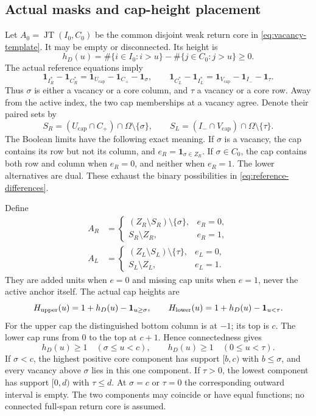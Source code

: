 \documentclass[11pt,a4paper]{amsart}
\numberwithin{equation}{section}
\theoremstyle{plain}
\theoremstyle{definition}
\newcommand{\one}{\mathbf1}
\newcommand{\JT}{\operatorname{JT}}
\begin{document}
\subsection{Actual masks and cap-height placement}
Let \(A_0=\JT(I_0,C_0)\) be the common disjoint weak return core in \eqref{eq:vacancy-template}.  It may be empty or disconnected.  Its height is
\[
 h_D(u)=\#\{i\in I_0:i>u\}-\#\{j\in C_0:j>u\}\ge0.
\]
The actual reference equations imply
\begin{equation}\label{eq:reference-differences}
 \one_{I_R^*}-\one_{C_R^*}=\one_{U_{\mathrm{cap}}}-\one_{C_+}-\one_\sigma,
 \qquad
 \one_{C_L^*}-\one_{I_L^*}=\one_{V_{\mathrm{cap}}}-\one_{I_-}-\one_\tau.
\end{equation}
Thus \(\sigma\) is either a vacancy or a core column, and \(\tau\) a vacancy or a core row.  Away from the active index, the two cap memberships at a vacancy agree.  Denote their paired sets by
\[
 S_R=(U_{\mathrm{cap}}\cap C_+)\cap\Omega\setminus\{\sigma\},\qquad
 S_L=(I_-\cap V_{\mathrm{cap}})\cap\Omega\setminus\{\tau\}.
\]
The Boolean limits have the following exact meaning.  If \(\sigma\) is a vacancy, the cap contains its row but not its column, and \(e_R=\one_{\sigma\in Z_R}\).  If \(\sigma\in C_0\), the cap contains both row and column when \(e_R=0\), and neither when \(e_R=1\).  The lower alternatives are dual.  These exhaust the binary possibilities in \eqref{eq:reference-differences}.

Define
\[
\begin{split}
 A_R&=
 \begin{cases}(Z_R\setminus S_R)\setminus\{\sigma\},&e_R=0,\\
 S_R\setminus Z_R,&e_R=1,
 \end{cases}\\
 A_L&=
 \begin{cases}(Z_L\setminus S_L)\setminus\{\tau\},&e_L=0,\\
 S_L\setminus Z_L,&e_L=1.
 \end{cases}
\end{split}
\]
They are added units when \(e=0\) and missing cap units when \(e=1\), never the active anchor itself.  The actual cap heights are
\begin{equation}\label{eq:cap-height-pole}
 H_{\rm upper}(u)=1+h_D(u)-\one_{u\ge\sigma},\qquad
 H_{\rm lower}(u)=1+h_D(u)-\one_{u<\tau}.
\end{equation}
For the upper cap the distinguished bottom column is at \(-1\); its top is \(c\).  The lower cap runs from \(0\) to the top at \(c+1\).  Hence connectedness gives
\begin{equation}\label{eq:cap-height-positive}
 h_D(u)\ge1\quad(\sigma\le u<c),\qquad
 h_D(u)\ge1\quad(0\le u<\tau).
\end{equation}
If \(\sigma<c\), the highest positive core component has support \([b,c)\) with \(b\le\sigma\), and every vacancy above \(\sigma\) lies in this one component.  If \(\tau>0\), the lowest component has support \([0,d)\) with \(\tau\le d\).  At \(\sigma=c\) or \(\tau=0\) the corresponding outward interval is empty.  The two components may coincide or have equal functions; no connected full-span return core is assumed.
\end{document}
